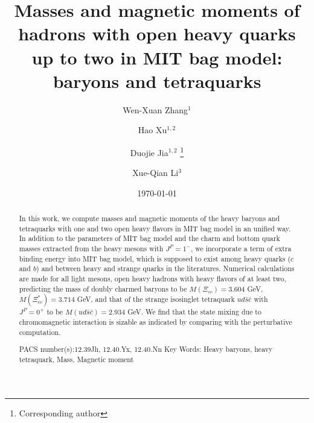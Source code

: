 \documentclass[prt,twocolumn,floatfix,nofootinbib]{revtex4}
\begin{document}
\title{Masses and magnetic moments of hadrons with open heavy quarks up to two in MIT bag model: baryons and tetraquarks}

\author{Wen-Xuan Zhang$^{1}$}
\author{Hao Xu$^{1,2}$}
\author{Duojie Jia$^{1,2}$
\footnote{Corresponding author}}
\author{Xue-Qian Li$^{3}$}



\begin{abstract}
In this work, we compute masses and magnetic moments of the heavy baryons and tetraquarks with one and two open heavy flavors in MIT bag model in an unified way. In addition to the parameters of MIT bag model and the charm and bottom quark masses extracted from the heavy mesons with $J^{P}=1^{-}$, we incorporate a term of extra binding energy into MIT bag model, which is supposed to exist among heavy quarks ($c$ and $b$) and between heavy and strange quarks in the literatures. Numerical calculations are made for all light mesons, open heavy hadrons with heavy flavors of at least two, predicting the mass of doubly charmed baryons to be $M(\Xi_{cc})=3.604$ GeV, $M(\Xi_{cc}^{\ast})=3.714$ GeV, and that of the strange isosinglet tetraquark $ud\bar{s}\bar{c}$ with $J^{P}=0^{+}$ to be $M\left(ud\bar{s}\bar{c}\right)=2.934$ GeV. We find that the state mixing due to chromomagnetic interaction is sizable as indicated by comparing with the perturbative computation.

{\normalsize PACS number(s):12.39Jh, 12.40.Yx, 12.40.Nn}
{\normalsize Key Words: Heavy baryons, heavy tetraquark, Mass, Magnetic moment}
\end{abstract}
\maketitle
\date{\today}
\end{document}
